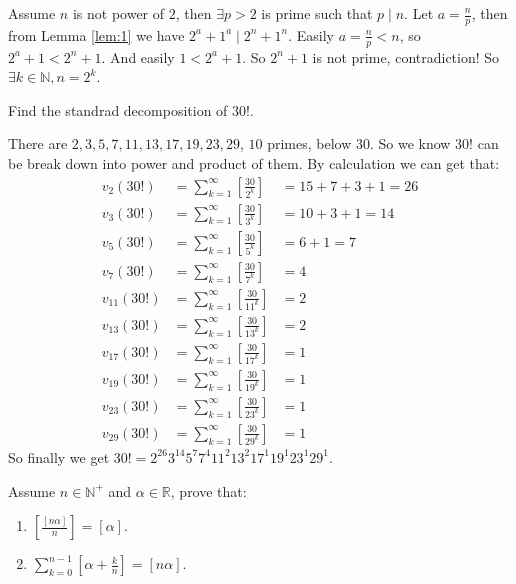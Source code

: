 \documentclass{ctexart}
\begin{document}
\begin{solution}
  Assume \(n\) is not power of \(2\), then \(\exists p>2\) is prime such that \(p \mid n\).
  Let \(a=\frac{n}{p}\), then from Lemma \ref{lem:1} we have \(2^a+1^a \mid 2^n+1^n\).
  Easily \(a=\frac{n}{p}<n\), so \(2^a+1<2^n+1\). And easily \(1<2^a+1\).
  So \(2^n+1\) is not prime, contradiction!
  So \(\exists k \in \mathbb{N},n=2^k\).
\end{solution}
\begin{problem}\label{pro:p16.1}
  Find the standrad decomposition of \(30!\).
\end{problem}
\begin{solution}
  There are \(2,3,5,7,11,13,17,19,23,29\), \(10\) primes, below \(30\).
  So we know \(30!\) can be break down into power and product of them.
  By calculation we can get that:
  \begin{equation}\label{equ:1}
    \begin{aligned}
      v_2(30!)    & =\sum_{k=1}^{\infty}\left[\frac{30}{2^k}\right]    & =15+7+3+1=26 \\
      v_3(30!)    & =\sum_{k=1}^{\infty}\left[\frac{30}{3^k}\right]    & =10+3+1=14   \\
      v_5(30!)    & =\sum_{k=1}^{\infty}\left[\frac{30}{5^k}\right]    & =6+1=7       \\
      v_7(30!)    & =\sum_{k=1}^{\infty}\left[\frac{30}{7^k}\right]    & =4           \\
      v_{11}(30!) & =\sum_{k=1}^{\infty}\left[\frac{30}{{11}^k}\right] & =2           \\
      v_{13}(30!) & =\sum_{k=1}^{\infty}\left[\frac{30}{{13}^k}\right] & =2           \\
      v_{17}(30!) & =\sum_{k=1}^{\infty}\left[\frac{30}{{17}^k}\right] & =1           \\
      v_{19}(30!) & =\sum_{k=1}^{\infty}\left[\frac{30}{{19}^k}\right] & =1           \\
      v_{23}(30!) & =\sum_{k=1}^{\infty}\left[\frac{30}{{23}^k}\right] & =1           \\
      v_{29}(30!) & =\sum_{k=1}^{\infty}\left[\frac{30}{{29}^k}\right] & =1
    \end{aligned}
  \end{equation}
  So finally we get \(30! = 2^{26} 3^{14} 5^7 7^4 11^2 13^2 17^1 19^1 23^1 29^1\).
\end{solution}
\begin{problem}\label{pro:p16.2}
  Assume \(n \in \mathbb{N}^+\) and \(\alpha \in \mathbb{R}\), prove that:
  \begin{enumerate}
    \item \(\left[\frac{[n \alpha]}{n}\right]=[\alpha]\).
    \item \(\sum_{k=0}^{n-1}[\alpha+\frac{k}{n}]=[n \alpha]\).
  \end{enumerate}
\end{problem}
\end{document}
